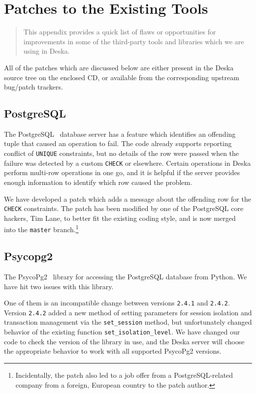 \documentclass[deska]{subfiles}
\begin{document}
\chapter{Patches to the Existing Tools}
\label{sec:patches}

\begin{abstract}
This appendix provides a quick list of flaws or opportunities for improvements in some of the third-party tools and
libraries which we are using in Deska.
\end{abstract}


All of the patches which are discussed below are either present in the Deska source tree on the enclosed CD, or
available from the corresponding upstream bug/patch trackers.

\section{PostgreSQL}

The PostgreSQL~\cite{postgresql} database server has a feature which identifies an offending tuple that caused an
operation to fail.  The code already supports reporting conflict of {\tt UNIQUE} constraints, but no details of the row
were passed when the failure was detected by a custom {\tt CHECK} or elsewhere.  Certain operations in Deska perform
multi-row operations in one go, and it is helpful if the server provides enough information to identify which row caused
the problem.

We have developed a patch which adds a message about the offending row for the {\tt CHECK} constraints.  The patch has
been modified by one of the PostgreSQL core hackers, Tim Lane, to better fit the existing coding style, and is now
merged~\cite{postgresql-check-patch} into the {\tt master} branch.\footnote{Incidentally, the patch also led to a job
offer from a PostgreSQL-related company from a foreign, European country to the patch author.}

\section{Psycopg2}

The PsycoPg2~\cite{psycopg} library for accessing the PostgreSQL database from Python.  We have hit two issues with this
library.

One of them is an incompatible change between versions {\tt 2.4.1} and {\tt 2.4.2}.  Version {\tt 2.4.2} added a new
method of setting parameters for session isolation and transaction management via the {\tt set\_session} method, but
unfortunately changed behavior of the existing function {\tt set\_isolation\_level}.  We have changed our code to check
the version of the library in use, and the Deska server will choose the appropriate behavior to work with all supported
PsycoPg2 versions.
\end{document}
